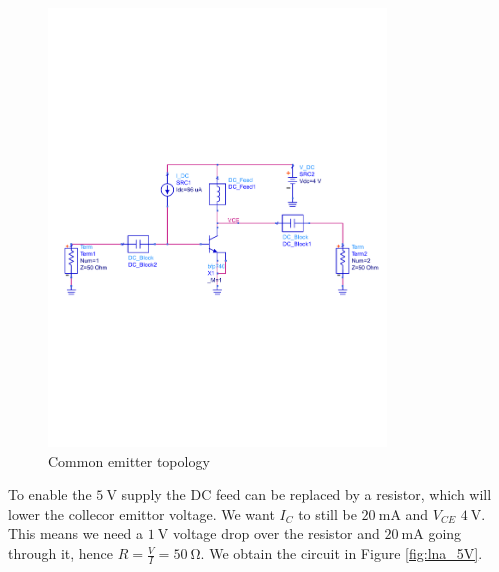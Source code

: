 \documentclass[a4paper]{article}        %
\begin{document}
			\begin{figure}[H]
			\centering
				\includegraphics[width=0.8\textwidth]{fig/LNA/LNA_start.pdf}
			\caption{Common emitter topology}
			\label{fig:lna_ce}
			\end{figure}

			To enable the $\SI{5}{\volt}$ supply the DC feed can be replaced by a resistor, which will lower the collecor emittor voltage. We want $I_C$ to still be $\SI{20}{\milli\ampere}$ and $V_{CE}$ $\SI{4}{\volt}$. This means we need a $\SI{1}{\volt}$ voltage drop over the resistor and $\SI{20}{\milli\ampere}$ going through it, hence $R = \frac{V}{I} = \SI{50}{\ohm}$. We obtain the circuit in Figure \ref{fig:lna_5V}.
\end{document}
